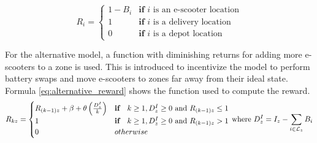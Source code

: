 \begin{equation}\label{eq:standard_reward}
    R_{i} = \begin{cases}
        1-B_{i} & \textbf{if }\text{$i$ is an e-scooter location} \\
        1 & \textbf{if }\text{$i$ is a delivery location} \\
        0 & \textbf{if }\text{$i$ is a depot location}
    \end{cases}
\end{equation}

For the alternative model, a function with diminishing returns for adding more e-scooters to a zone is used. This is introduced to incentivize the model to perform battery swaps and move e-scooters to zones far away from their ideal state. Formula \eqref{eq:alternative_reward} shows the function used to compute the reward. 
\begin{equation}
    \begin{split}\label{eq:alternative_reward}
        R_{kz} = \begin{cases} 
            R_{(k-1)z} + \beta + \theta\left(\frac{D^I_z}{k}\right) & \textbf{if}\quad k \geq 1, D^I_z \geq 0  \text{ and } R_{(k-1)z} \leq 1\\
            1 & \textbf{if} \quad k \geq 1, D^I_z \geq 0  \text{ and } R_{(k-1)z} > 1\\
            0 & otherwise
        \end{cases} \\
    \end{split}
    \\\nonumber
    \\
    \text{ where } D^I_z = I_z - \displaystyle\sum_{i\in \mathcal{L}_z} B_i \nonumber
\end{equation}

